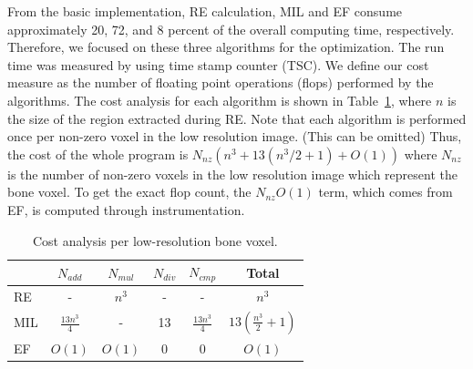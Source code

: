\documentclass[letterpaper]{article}
\begin{document}

From the basic implementation, RE calculation, MIL and EF consume approximately 20, 72, and 8 percent of the overall computing time, respectively. Therefore, we focused on these three algorithms for the optimization. The run time was measured by using time stamp counter (TSC).  We define our cost measure as the number of floating point operations (flops) performed by the algorithms. The cost analysis for each algorithm is shown in Table~\ref{tab:cost}, where $n$ is the size of the region extracted during RE. Note that each algorithm is performed once per non-zero voxel in the low resolution image. {\color{red} (This can be omitted)} Thus, the cost of the whole program is $N_{nz}(n^3 + 13(n^3/2+1) + O(1))$ where $N_{nz}$ is the number of non-zero voxels in the low resolution image which represent the bone voxel. To get the exact flop count, the $N_{nz}O(1)$ term, which comes from EF, is computed through instrumentation.

\begin{table}[H]
    \caption{Cost analysis per low-resolution bone voxel.}
    \label{tab:cost}
    \begin{tabular}{l c c c c | c}
        \toprule
        & $N_{add}$ & $N_{mul}$ & $N_{div}$ & $N_{cmp}$ & Total\\
        \midrule
        RE & - & $n^{3}$ & - & - &   $n^{3}$\\
        MIL & $\frac{13n^{3}}{4}$ & -  & 13 & $\frac{13n^{3}}{4}$ &  $13(\frac{n^{3}}{2}+1)$\\
        EF & $O(1)$ & $O(1)$ & 0 & 0 & $O(1)$\\
        \bottomrule
    \end{tabular}
\end{table}
\end{document}
